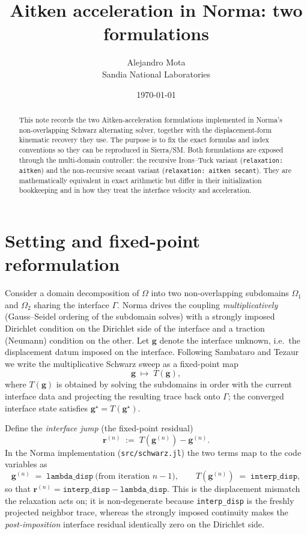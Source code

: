 \documentclass[11pt]{article}
\title{\vspace{-2em}Aitken acceleration in Norma: two formulations}
\author{Alejandro Mota \\ \small Sandia National Laboratories}
\date{\today}
\begin{document}
\maketitle

\begin{abstract}
This note records the two Aitken-acceleration formulations implemented in
Norma's non-overlapping Schwarz alternating solver, together with the
displacement-form kinematic recovery they use. The purpose is to fix the exact
formulas and index conventions so they can be reproduced in Sierra/SM. Both
formulations are exposed through the multi-domain controller: the recursive
Irons--Tuck variant (\texttt{relaxation: aitken}) and the non-recursive secant
variant (\texttt{relaxation: aitken secant}). They are mathematically
equivalent in exact arithmetic but differ in their initialization bookkeeping
and in how they treat the interface velocity and acceleration.
\end{abstract}

\section{Setting and fixed-point reformulation}

Consider a domain decomposition of $\Omega$ into two non-overlapping subdomains
$\Omega_1$ and $\Omega_2$ sharing the interface $\Gamma$. Norma drives the
coupling \emph{multiplicatively} (Gauss--Seidel ordering of the subdomain
solves) with a strongly imposed Dirichlet condition on the Dirichlet side of
the interface and a traction (Neumann) condition on the other. Let $\bm{g}$
denote the interface unknown, i.e.\ the displacement datum imposed on the
interface. Following Sambataro and Tezaur~\cite{SambataroTezaur} we write the
multiplicative Schwarz sweep as a fixed-point map
\begin{equation}
    \bm{g} \;\mapsto\; T(\bm{g}),
    \label{eq:T}
\end{equation}
where $T(\bm{g})$ is obtained by solving the subdomains in order with the
current interface data and projecting the resulting trace back onto $\Gamma$;
the converged interface state satisfies $\bm{g}^\star = T(\bm{g}^\star)$.

Define the \emph{interface jump} (the fixed-point residual)
\begin{equation}
    \bm{r}^{(n)} \;:=\; T\!\left(\bm{g}^{(n)}\right) - \bm{g}^{(n)} .
    \label{eq:residual}
\end{equation}
In the Norma implementation (\texttt{src/schwarz.jl}) the two terms map to the
code variables as
\begin{equation*}
    \bm{g}^{(n)} \;=\; \texttt{lambda\_disp} \ \text{(from iteration $n{-}1$)},
    \qquad
    T\!\left(\bm{g}^{(n)}\right) \;=\; \texttt{interp\_disp} ,
\end{equation*}
so that $\bm{r}^{(n)} = \texttt{interp\_disp} - \texttt{lambda\_disp}$. This is
the displacement mismatch the relaxation acts on; it is non-degenerate because
\texttt{interp\_disp} is the freshly projected neighbor trace, whereas the
strongly imposed continuity makes the \emph{post-imposition} interface residual
identically zero on the Dirichlet side.
\end{document}
